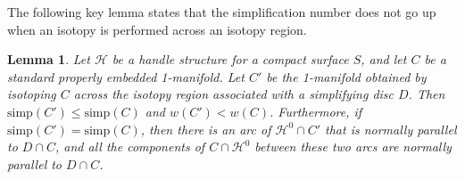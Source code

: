 \documentclass[oneside]{amsart}
\numberwithin{equation}{section}
\theoremstyle{plain}
\newtheorem{lemma}[equation]{Lemma}
\theoremstyle{definition}
\newcommand{\calH}{\mathcal{H}}
\begin{document}
The following key lemma states that the simplification number does not go up when an isotopy is performed across an isotopy region.

\begin{lemma}
\label{Lem:SimpDoesNotGoUp}
Let $\calH$ be a handle structure for a compact surface $S$, and let $C$ be a standard properly embedded 1-manifold.
Let $C'$ be the 1-manifold obtained by isotoping $C$ across the isotopy region associated with a simplifying disc $D$. Then $\mathrm{simp}(C') \leq  \mathrm{simp}(C)$ and $w(C') < w(C)$. Furthermore, if $\mathrm{simp}(C') =  \mathrm{simp}(C)$, then there is an arc of $\calH^0 \cap C'$ that is normally parallel to $D \cap C$, and all the components of $C \cap \calH^0$ between these two arcs are normally parallel to $D \cap C$.
\end{lemma}
\end{document}
